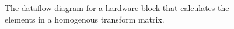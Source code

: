 \begin{figure}[ht]
\center
{}
\caption{The dataflow diagram for a hardware block that calculates the elements in a homogenous transform matrix.}
\label{fig:dh_transform_block}
\end{figure}



